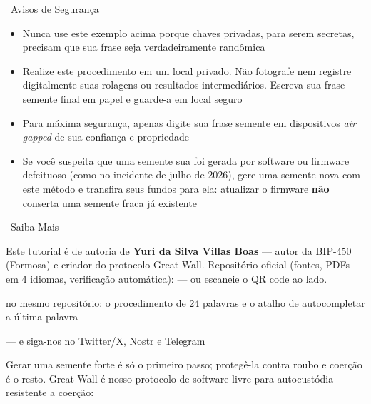 \documentclass[10pt]{article}
\begin{document}
\begin{warnbox}{\faExclamationTriangle~Avisos de Segurança}
\begin{itemize}[itemsep=1pt]
 \item Nunca use este exemplo acima porque chaves privadas, para serem secretas, precisam que sua frase seja verdadeiramente randômica
 \item Realize este procedimento em um local privado. Não fotografe nem registre digitalmente suas rolagens ou resultados intermediários. Escreva sua frase semente final em papel e guarde-a em local seguro
 \item Para máxima segurança, apenas digite sua frase semente em dispositivos \textit{air gapped} de sua confiança e propriedade
 \item Se você suspeita que uma semente sua foi gerada por software ou firmware defeituoso (como no incidente de julho de 2026), gere uma semente nova com este método e transfira seus fundos para ela: atualizar o firmware \textbf{não} conserta uma semente fraca já existente
\end{itemize}
\end{warnbox}

\begin{infobox}{\faInfoCircle~Saiba Mais}
\begin{minipage}[c]{0.8\textwidth}
Este tutorial é de autoria de \textbf{Yuri da Silva Villas Boas} --- autor da BIP-450 (Formosa) e criador do protocolo Great Wall. Repositório oficial (fontes, PDFs em 4 idiomas, verificação automática): \repolink --- ou escaneie o QR code ao lado.

\begin{description}[itemsep=1pt]
 \item [Edição estendida --- 24 palavras:] no mesmo repositório: o procedimento de 24 palavras e o atalho de autocompletar a última palavra
 \item [Mais tutoriais, cursos e comunidade:] \sitelink --- e siga-nos no Twitter/X, Nostr e Telegram
 \item [Great Wall:] Gerar uma semente forte é só o primeiro passo; protegê-la contra roubo e coerção é o resto. Great Wall é nosso protocolo de software livre para autocustódia resistente a coerção: \gwlink
\end{description}

\end{minipage}%
\hfill
\begin{minipage}[c]{0.15\textwidth}
\centering
\repoqr
\end{minipage}
\end{infobox}

\end{document}
